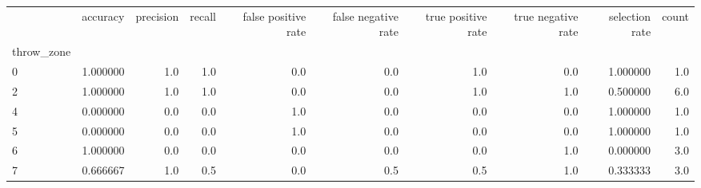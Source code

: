 \begin{tabular}{lrrrrrrrrr}
\toprule
{} &  accuracy &  precision &  recall &  false positive rate &  false negative rate &  true positive rate &  true negative rate &  selection rate &  count \\
throw\_zone &           &            &         &                      &                      &                     &                     &                 &        \\
\midrule
0          &  1.000000 &        1.0 &     1.0 &                  0.0 &                  0.0 &                 1.0 &                 0.0 &        1.000000 &    1.0 \\
2          &  1.000000 &        1.0 &     1.0 &                  0.0 &                  0.0 &                 1.0 &                 1.0 &        0.500000 &    6.0 \\
4          &  0.000000 &        0.0 &     0.0 &                  1.0 &                  0.0 &                 0.0 &                 0.0 &        1.000000 &    1.0 \\
5          &  0.000000 &        0.0 &     0.0 &                  1.0 &                  0.0 &                 0.0 &                 0.0 &        1.000000 &    1.0 \\
6          &  1.000000 &        0.0 &     0.0 &                  0.0 &                  0.0 &                 0.0 &                 1.0 &        0.000000 &    3.0 \\
7          &  0.666667 &        1.0 &     0.5 &                  0.0 &                  0.5 &                 0.5 &                 1.0 &        0.333333 &    3.0 \\
\bottomrule
\end{tabular}
